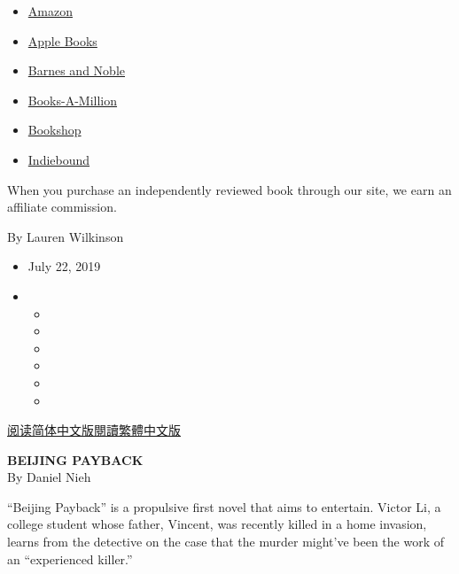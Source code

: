 \begin{itemize}
\tightlist
\item
  \href{https://www.amazon.com/gp/search?index=books\&tag=NYTBSREV-20\&field-keywords=Beijing+Payback+Daniel+Nieh}{Amazon}
\item
  \href{https://du-gae-books-dot-nyt-du-prd.appspot.com/buy?title=Beijing+Payback\&author=Daniel+Nieh}{Apple
  Books}
\item
  \href{https://www.anrdoezrs.net/click-7990613-11819508?url=https\%3A\%2F\%2Fwww.barnesandnoble.com\%2Fw\%2F\%3Fean\%3D9780062886644}{Barnes
  and Noble}
\item
  \href{https://www.anrdoezrs.net/click-7990613-35140?url=https\%3A\%2F\%2Fwww.booksamillion.com\%2Fp\%2FBeijing\%2BPayback\%2FDaniel\%2BNieh\%2F9780062886644}{Books-A-Million}
\item
  \href{https://bookshop.org/a/3546/9780062886644}{Bookshop}
\item
  \href{https://www.indiebound.org/book/9780062886644?aff=NYT}{Indiebound}
\end{itemize}

When you purchase an independently reviewed book through our site, we
earn an affiliate commission.

By Lauren Wilkinson

\begin{itemize}
\item
  July 22, 2019
\item
  \begin{itemize}
  \item
  \item
  \item
  \item
  \item
  \item
  \end{itemize}
\end{itemize}

\href{https://cn.nytimes3xbfgragh.onion/culture/20190723/beijing-payback-daniel-nieh/}{阅读简体中文版}\href{https://cn.nytimes3xbfgragh.onion/culture/20190723/beijing-payback-daniel-nieh/zh-hant/}{閱讀繁體中文版}

\textbf{BEIJING PAYBACK}\\
By Daniel Nieh

``Beijing Payback'' is a propulsive first novel that aims to entertain.
Victor Li, a college student whose father, Vincent, was recently killed
in a home invasion, learns from the detective on the case that the
murder might've been the work of an ``experienced killer.''

